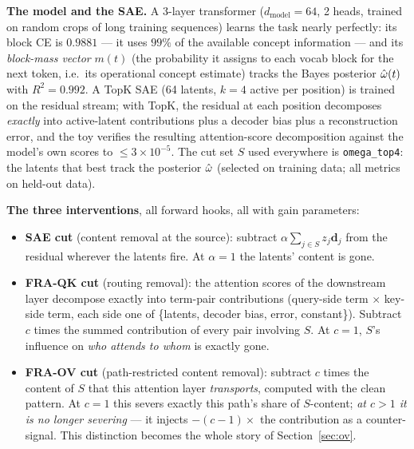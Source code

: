 \documentclass{article}
\begin{document}
\textbf{The model and the SAE.} A 3-layer transformer ($d_{\mathrm{model}} = 64$, 2 heads, trained on random crops of long training sequences) learns the task nearly perfectly: its block CE is $0.9881$ --- it uses $99\%$ of the available concept information --- and its \emph{block-mass vector} $m(t)$ (the probability it assigns to each vocab block for the next token, i.e.\ its operational concept estimate) tracks the Bayes posterior $\hat{\omega}(t)$ with $R^2 = 0.992$. A TopK SAE (64 latents, $k = 4$ active per position) is trained on the residual stream; with TopK, the residual at each position decomposes \emph{exactly} into active-latent contributions plus a decoder bias plus a reconstruction error, and the toy verifies the resulting attention-score decomposition against the model's own scores to $\le 3\times10^{-5}$. The cut set $S$ used everywhere is \texttt{omega\_top4}: the latents that best track the posterior $\hat{\omega}$ (selected on training data; all metrics on held-out data).

\textbf{The three interventions}, all forward hooks, all with gain parameters:
\begin{itemize}
    \item \textbf{SAE cut} (content removal at the source): subtract $\alpha \sum_{j \in S} z_j \boldsymbol{d}_j$ from the residual wherever the latents fire. At $\alpha = 1$ the latents' content is gone.
    \item \textbf{FRA-QK cut} (routing removal): the attention scores of the downstream layer decompose exactly into term-pair contributions (query-side term $\times$ key-side term, each side one of \{latents, decoder bias, error, constant\}). Subtract $c$ times the summed contribution of every pair involving $S$. At $c = 1$, $S$'s influence on \emph{who attends to whom} is exactly gone.
    \item \textbf{FRA-OV cut} (path-restricted content removal): subtract $c$ times the content of $S$ that this attention layer \emph{transports}, computed with the clean pattern. At $c = 1$ this severs exactly this path's share of $S$-content; \emph{at $c > 1$ it is no longer severing} --- it injects $-(c-1)\times$ the contribution as a counter-signal. This distinction becomes the whole story of Section~\ref{sec:ov}.
\end{itemize}
\end{document}
